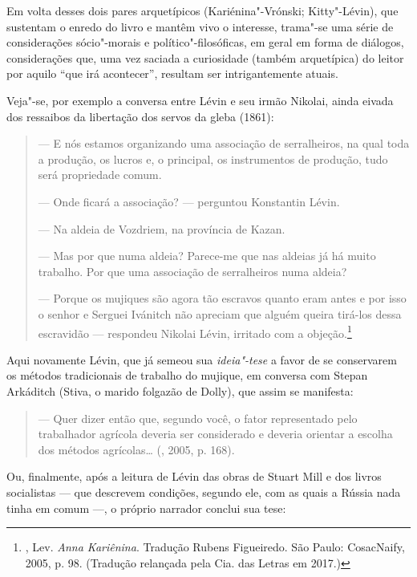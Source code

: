 Em volta desses dois pares arquetípicos (Kariénina"-Vrónski; Kitty"-Lévin), que sustentam o enredo do
livro e mantêm vivo o interesse, trama"-se uma série de considerações
sócio"-morais e político"-filosóficas, em geral em forma de diálogos, considerações que,
uma vez saciada a curiosidade (também arquetípica) do leitor por aquilo
``que irá acontecer'', resultam ser intrigantemente atuais.

Veja"-se, por exemplo a conversa entre Lévin e seu irmão Nikolai, ainda
eivada dos ressaibos da libertação dos servos da gleba (1861):

\begin{quotation}
--- E nós estamos organizando uma associação de serralheiros, na qual toda a produção, os
lucros e, o principal, os instrumentos de produção, tudo será propriedade comum.

--- Onde ficará a associação? --- perguntou Konstantin Lévin.

--- Na aldeia de Vozdriem, na província de Kazan.

--- Mas por que numa aldeia? Parece-me que nas aldeias
já há muito trabalho. Por que uma associação de serralheiros numa aldeia?

--- Porque os mujiques são agora tão escravos quanto
eram antes e por isso o senhor e Serguei Ivánitch não apreciam
que alguém queira tirá-los dessa escravidão --- respondeu Nikolai
Lévin, irritado com a objeção.\footnote{, Lev. \emph{Anna Kariênina}. Tradução Rubens Figueiredo. São Paulo: CosacNaify, 2005, p. 98. (Tradução relançada pela Cia. das Letras em 2017.)}
\end{quotation}

Aqui novamente Lévin, que já semeou sua \emph{ideia"-tese} a
favor de se conservarem os métodos tradicionais de trabalho do
mujique, em conversa com Stepan Arkáditch (Stiva, o marido folgazão de
Dolly), que assim se manifesta:

\begin{quotation}
--- Quer dizer então que, segundo você, o fator representado pelo
trabalhador agrícola deveria ser considerado e deveria orientar a
escolha dos métodos agrícolas\ldots{} (, 2005, p. 168).
\end{quotation}

Ou, finalmente, após a leitura de Lévin das obras de Stuart Mill e dos livros
socialistas --- que descrevem condições, segundo ele, com as
quais a Rússia nada tinha em comum ---, o próprio
narrador conclui sua tese:

